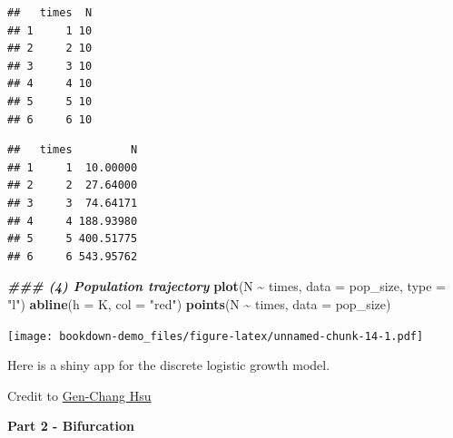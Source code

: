 \documentclass[
]{book}
\newenvironment{Shaded}{\begin{snugshade}}{\end{snugshade}}
\newcommand{\AttributeTok}[1]{\textcolor[rgb]{0.13,0.29,0.53}{#1}}
\newcommand{\ControlFlowTok}[1]{\textcolor[rgb]{0.13,0.29,0.53}{\textbf{#1}}}
\newcommand{\DecValTok}[1]{\textcolor[rgb]{0.00,0.00,0.81}{#1}}
\newcommand{\DocumentationTok}[1]{\textcolor[rgb]{0.56,0.35,0.01}{\textbf{\textit{#1}}}}
\newcommand{\FunctionTok}[1]{\textcolor[rgb]{0.13,0.29,0.53}{\textbf{#1}}}
\newcommand{\NormalTok}[1]{#1}
\newcommand{\OtherTok}[1]{\textcolor[rgb]{0.56,0.35,0.01}{#1}}
\newcommand{\SpecialCharTok}[1]{\textcolor[rgb]{0.81,0.36,0.00}{\textbf{#1}}}
\newcommand{\StringTok}[1]{\textcolor[rgb]{0.31,0.60,0.02}{#1}}
\begin{document}
\begin{verbatim}
##   times  N
## 1     1 10
## 2     2 10
## 3     3 10
## 4     4 10
## 5     5 10
## 6     6 10
\end{verbatim}

\begin{Shaded}
\end{Shaded}

\begin{verbatim}
##   times         N
## 1     1  10.00000
## 2     2  27.64000
## 3     3  74.64171
## 4     4 188.93980
## 5     5 400.51775
## 6     6 543.95762
\end{verbatim}

\begin{Shaded}
\begin{Highlighting}[]
\DocumentationTok{\#\#\# (4) Population trajectory}
\FunctionTok{plot}\NormalTok{(N }\SpecialCharTok{\textasciitilde{}}\NormalTok{ times, }\AttributeTok{data =}\NormalTok{ pop\_size, }\AttributeTok{type =} \StringTok{"l"}\NormalTok{)}
\FunctionTok{abline}\NormalTok{(}\AttributeTok{h =}\NormalTok{ K, }\AttributeTok{col =} \StringTok{"red"}\NormalTok{)}
\FunctionTok{points}\NormalTok{(N }\SpecialCharTok{\textasciitilde{}}\NormalTok{ times, }\AttributeTok{data =}\NormalTok{ pop\_size)}
\end{Highlighting}
\end{Shaded}

\texttt{[image: bookdown-demo\_files/figure-latex/unnamed-chunk-14-1.pdf]}

Here is a shiny app for the discrete logistic growth model.

Credit to \href{https://genchanghsu.github.io/index.html}{Gen-Chang Hsu}

\textbf{Part 2 - Bifurcation}
\end{document}
